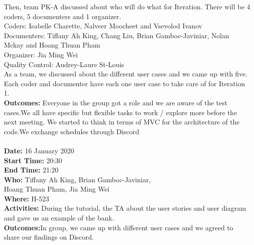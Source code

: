 \documentclass[12pt]{article}
\begin{document}
Then, team PK-A discussed about who will do what for Iteration. There will be 4 coders, 5 documenters and 1 organizer. \\

Coders: Isabelle Charette, Nalveer Moocheet and Vsevolod Ivanov\\
Documenters: Tiffany Ah King, Chang Liu, Brian Gamboc-Javiniar, Nolan Mckay and  Hoang Thuan Pham\\

Organizer: Jia Ming Wei\\

Quality Control: Audrey-Laure St-Louis\\

As a team, we discussed about the different user cases and we came up with five. Each coder and documenter have each one user case to take care of for Iteration 1. 
\\

{\bf Outcomes:} Everyone in the group got a role and we are aware of the test cases.We all have specific but flexible tasks to work / explore more before the next meeting. We started to think in terms of MVC for the architecture of the code.We exchange schedules through Discord\\\\

{\bf Date:} 16 January 2020\\
{\bf Start Time:} 20:30\\
{\bf End Time:} 21:20\\
{\bf Who:} Tiffany Ah King, Brian Gamboc-Javiniar,\\
 Hoang Thuan Pham, Jia Ming Wei\\
{\bf Where:} H-523\\
{\bf Activities:} During the tutorial, the TA about the user stories and user diagram and gave us an example of the bank.\\
{\bf Outcomes:}In group, we came up with different user cases and we agreed to share our findings on Discord.\\ \\
\end{document}
